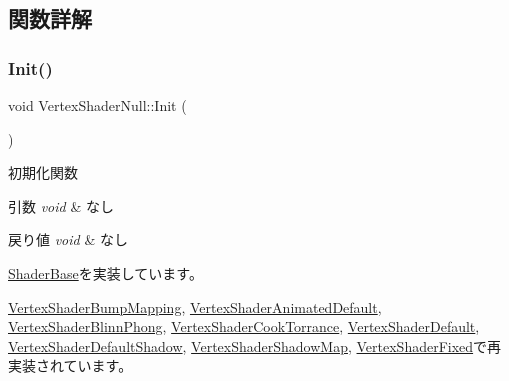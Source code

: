 \subsection{関数詳解}
\mbox{\label{class_vertex_shader_null_a4d79b358dab49c840345d74823a16840}} 
\subsubsection{\texorpdfstring{Init()}{Init()}}
{\footnotesize\ttfamily void Vertex\+Shader\+Null\+::\+Init (\begin{DoxyParamCaption}{ }\end{DoxyParamCaption})\hspace{0.3cm}{\ttfamily [virtual]}}



初期化関数 


\begin{DoxyParams}{引数}
{\em void} & なし \\
\hline
\end{DoxyParams}

\begin{DoxyRetVals}{戻り値}
{\em void} & なし \\
\hline
\end{DoxyRetVals}


\mbox{\hyperlink{class_shader_base_a9622b2f5e0184a78d3af82820dc5113d}{Shader\+Base}}を実装しています。



\mbox{\hyperlink{class_vertex_shader_bump_mapping_a6c0f59d1f29fd883943a66bfe61b6b03}{Vertex\+Shader\+Bump\+Mapping}}, \mbox{\hyperlink{class_vertex_shader_animated_default_a974cb247b42cb1c9288a9de9ed9048e9}{Vertex\+Shader\+Animated\+Default}}, \mbox{\hyperlink{class_vertex_shader_blinn_phong_a565b15a20d6c73d8b8e0c7dcc3078464}{Vertex\+Shader\+Blinn\+Phong}}, \mbox{\hyperlink{class_vertex_shader_cook_torrance_afab2193c27ca9cdc8490585743cd7ca3}{Vertex\+Shader\+Cook\+Torrance}}, \mbox{\hyperlink{class_vertex_shader_default_afdf5dbbc83e9007fa85ed345e228d304}{Vertex\+Shader\+Default}}, \mbox{\hyperlink{class_vertex_shader_default_shadow_ad0033ccbf57a28ab9879313d3f300338}{Vertex\+Shader\+Default\+Shadow}}, \mbox{\hyperlink{class_vertex_shader_shadow_map_ad05ff60e979b3d2af8603a118cb51185}{Vertex\+Shader\+Shadow\+Map}}, \mbox{\hyperlink{class_vertex_shader_fixed_ae829ff736b33c45543804059255125b6}{Vertex\+Shader\+Fixed}}で再実装されています。




